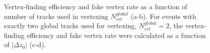 \begin{figure}[h]
{		\begin{subfigure}[b]{\linewidth}{
				}
		\end{subfigure}
	}
	\quad
	\parbox{0.484\textwidth}{
		\centering
		\begin{subfigure}[b]{\linewidth}{
				}
		\end{subfigure}
	}
	\caption[Vertex-finding efficiency and fake vertex rate]{Vertex-finding efficiency and fake vertex rate as a function of number of tracks used in vertexing $N^{global}_{vrt}$ (a-b). For events with exactly two global tracks used for vertexing, $N^{global}_{vrt}=2$, the vertex-finding efficiency and fake vertex rate were calculated as a function of $|\Delta z_0|$ (c-d).}
	\label{fig:vertexEfficiency}
\end{figure}
